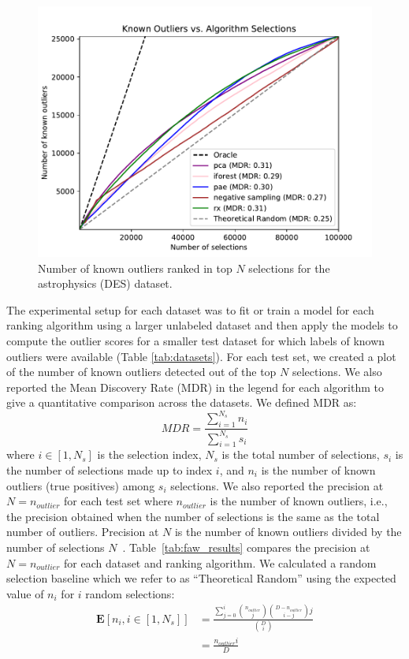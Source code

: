 \documentclass[letterpaper]{article} %
\begin{document}
\begin{figure}[h]
    \centering
    \includegraphics[width=\linewidth]{figures/des_combined_plot.pdf}
    \caption{Number of known outliers ranked in top $N$ selections for 
    the astrophysics (DES) dataset.}
    \label{fig:des_results}
\end{figure}

The experimental setup for each dataset was to fit or train a model for
each ranking algorithm using a larger unlabeled dataset and then apply 
the models to compute the outlier scores for a smaller test dataset for which
labels of known outliers were available (Table \ref{tab:datasets}). 
For each test set, we created a plot of the number of known outliers 
detected out of the top $N$ selections. We also 
reported the Mean Discovery Rate (MDR) in the legend
for each algorithm to give a quantitative comparison across the datasets. We defined MDR as:
\begin{equation}
MDR = \frac{\sum^{N_s}_{i=1} n_i}{\sum^{N_s}_{i=1} s_i}
\end{equation}
where $i \in [1, N_s]$ is the selection index,
 $N_s$ is the total number of selections,
 $s_i$ is the number of selections made up to index $i$,
 and $n_i$ is the number of known outliers (true positives)
among $s_i$ selections.
We also reported the precision at $N=n_{outlier}$ for each test set where
$n_{outlier}$ is the number of known outliers, i.e.,  the precision obtained 
when the number of selections is the same as the total number of outliers. 
Precision at $N$ is the number of known outliers divided by the number of 
selections $N$~\citep{campos2016evaluation}.
Table~\ref{tab:faw_results} compares the precision at $N=n_{outlier}$ for
each dataset and ranking algorithm. 
We calculated a random selection baseline which we refer to as ``Theoretical
Random'' using the expected value of $n_i$ for $i$ random selections:
\begin{align}
\mathbf{E}[n_i, i \in[1, N_s]] &= \frac{\sum^i_{j=0} {n_{outlier}\choose j} {D-n_{outlier}\choose i-j} j}{{D\choose i}} \\
&= \frac{n_{outlier}i}{D}
\end{align}
\end{document}
